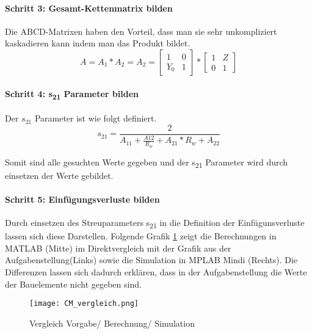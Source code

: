 \paragraph{Schritt 3: Gesamt-Kettenmatrix bilden}\label{paragraph:schritt3}
Die ABCD-Matrixen haben den Vorteil, dass man sie sehr unkompliziert kaskadieren kann indem man das Produkt bildet.
\begin{equation}
A = A_1*A_2 = A_2 = \left[\begin{matrix}
1 & 0\\ Y_0&1 
\end{matrix}\right] * 
\left[\begin{matrix}
1 & Z\\ 0&1 
\end{matrix} \right]
\end{equation}

\paragraph{Schritt 4: s\textsubscript{21} Parameter bilden}\label{paragraph:schritt4}
Der $s_{21}$ Parameter ist wie folgt definiert.
\begin{equation}\label{equ:def_s21_aparams}
s_{21} = \frac{2}{A_{11}+\frac{A{12}}{R_w}+A_{21}*R_w+A_{22}}
\end{equation}

Somit sind alle gesuchten Werte gegeben und der s\textsubscript{21} Parameter wird durch einsetzen der Werte gebildet.

\paragraph{Schritt 5: Einfügungsverluste bilden}\label{paragraph:schritt5}
Durch einsetzen des Streuparameters s\textsubscript{21} in die Definition der Einfügunsverluste lassen sich diese Darstellen. Folgende Grafik \ref{fig:Vergleich Berechnung Simulation} zeigt die Berechnungen in MATLAB (Mitte) im Direktvergleich mit der Grafik aus der Aufgabenstellung(Links) sowie die Simulation in MPLAB Mindi (Rechts). Die Differenzen lassen sich dadurch erklären, dass in der Aufgabenstellung die Werte der Bauelemente nicht gegeben sind.
\begin{figure}[H]
	\centering
	\texttt{[image: CM\_vergleich.png]}
	\caption{Vergleich Vorgabe/ Berechnung/ Simulation}
	\label{fig:Vergleich Berechnung Simulation}
\end{figure}
